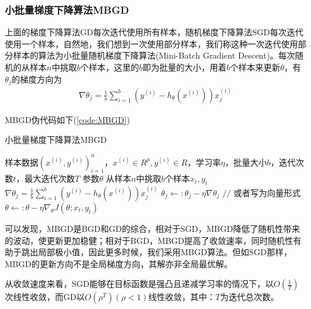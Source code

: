         \subsubsection{小批量梯度下降算法MBGD}
            \par
            上面的梯度下降算法GD每次迭代使用所有样本，随机梯度下降算法SGD每次迭代使用一个样本，自然地，我们想到一次使用部分样本，我们称这种一次迭代使用部分样本的算法为小批量随机梯度下降算法(Mini-Batch Gradient Descent)。每次随机的从样本$n$中挑取$b$个样本，这里的$b$即为批量的大小，用着$b$个样本来更新$\theta$，有$\theta_j$的梯度方向为
            \begin{align*}
            \nabla \theta_j = \frac{1}{b} \sum_{i=1}^b\left(y^{(i)}  -  h_\theta \left( x^{(i)} \right) \right) x_j^{(i)}
            \end{align*}
            \par
            MBGD伪代码如下(\ref{code:MBGD})
            \begin{algorithm}[h]
                \caption{小批量梯度下降算法MBGD}\label{code:MBGD}
                \begin{algorithmic}[1]
                    \Require 样本数据$(x^{(i)},y^{(i)})_{i=1}^n$，$x^{(i)}\in R^p,y^{(i)}\in R$，学习率$\eta$，批量大小$b$，迭代次数$t$，最大迭代次数$T$
                    \Ensure 参数$\theta$
                      \State 从样本$n$中挑取$b$个样本$x_t,y_t$
                        \State $\nabla \theta_j = \frac{1}{b} \sum\limits_{i=1}^b\left(y^{(i)}  -  h_\theta \left( x^{(i)} \right) \right) x_j^{(i)}$
                        \State $\theta_j \leftarrow:\theta_j - \eta \nabla\theta_j$
                      \EndFor
                      \State $//$ 或者写为向量形式
                      \State $\theta \leftarrow: \theta - \eta \nabla_\theta J(\theta;x_{t},y_{t})$
                    \EndFor
                \end{algorithmic}
            \end{algorithm}
            \par
            可以发现，MBGD是BGD和GD的综合，相对于SGD，MBGD降低了随机性带来的波动，使更新更加稳健；相对于BGD，MBGD提高了收敛速率，同时随机性有助于跳出局部极小值，因此更多时候，我们采用MBGD算法。但如SGD那样，MBGD的更新方向不是全局梯度方向，其解亦非全局最优解。
            \par
            从收敛速度来看，SGD能够在目标函数是强凸且递减学习率的情况下，以$O(\frac{1}{T})$次线性收敛，而GD以$O(\rho^T)(\rho<1)$线性收敛，其中：$T$为迭代总次数。
